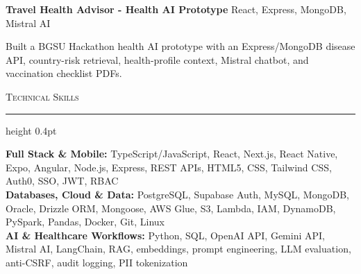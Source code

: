 \documentclass[letterpaper,11pt]{article}
\newcommand{\resumesection}[1]{%
  \par\vspace{2pt}%
  {\large\scshape #1}\par\vspace{2pt}%
  \hrule height 0.4pt\vspace{2pt}%
}
\newcommand{\projectHeading}[2]{
  \textbf{#1} \hfill #2
}
\begin{document}
\projectHeading{Travel Health Advisor - Health AI Prototype}{React, Express, MongoDB, Mistral AI}
\begin{tightitemize}
  \item Built a BGSU Hackathon health AI prototype with an Express/MongoDB disease API, country-risk retrieval, health-profile context, Mistral chatbot, and vaccination checklist PDFs.
\end{tightitemize}

\resumesection{Technical Skills}
\textbf{Full Stack \& Mobile:} TypeScript/JavaScript, React, Next.js, React Native, Expo, Angular, Node.js, Express, REST APIs, HTML5, CSS, Tailwind CSS, Auth0, SSO, JWT, RBAC\\
\textbf{Databases, Cloud \& Data:} PostgreSQL, Supabase Auth, MySQL, MongoDB, Oracle, Drizzle ORM, Mongoose, AWS Glue, S3, Lambda, IAM, DynamoDB, PySpark, Pandas, Docker, Git, Linux\\
\textbf{AI \& Healthcare Workflows:} Python, SQL, OpenAI API, Gemini API, Mistral AI, LangChain, RAG, embeddings, prompt engineering, LLM evaluation, anti-CSRF, audit logging, PII tokenization
\end{document}
